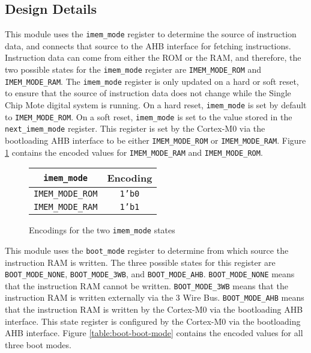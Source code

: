 \subsection{Design Details}
This module uses the \texttt{imem\_mode} register to determine the source of instruction data, and connects that source to the AHB interface for fetching instructions. Instruction data can come from either the ROM or the RAM, and therefore, the two possible states for the \texttt{imem\_mode} register are \texttt{IMEM\_MODE\_ROM} and \texttt{IMEM\_MODE\_RAM}. The \texttt{imem\_mode} register is only updated on a hard or soft reset, to ensure that the source of instruction data does not change while the Single Chip Mote digital system is running. On a hard reset, \texttt{imem\_mode} is set by default to \texttt{IMEM\_MODE\_ROM}. On a soft reset, \texttt{imem\_mode} is set to the value stored in the \texttt{next\_imem\_mode} register. This register is set by the Cortex-M0 via the bootloading AHB interface to be either \texttt{IMEM\_MODE\_ROM} or \texttt{IMEM\_MODE\_RAM}. Figure \ref{table:boot-imem-mode} contains the encoded values for \texttt{IMEM\_MODE\_RAM} and \texttt{IMEM\_MODE\_ROM}.

\begin{figure}
	\centering
	\begin{tabular}{|c|c|}
		\hline
		\texttt{imem\_mode} & Encoding \\
		\hline
		\texttt{IMEM\_MODE\_ROM} & \texttt{1'b0} \\
		\texttt{IMEM\_MODE\_RAM} & \texttt{1'b1} \\
		\hline
	\end{tabular}
	\caption{Encodings for the two \texttt{imem\_mode} states}
	\label{table:boot-imem-mode}
\end{figure}


This module uses the \texttt{boot\_mode} register to determine from which source the instruction RAM is written. The three possible states for this register are \texttt{BOOT\_MODE\-\_NONE}, \texttt{BOOT\_MODE\_3WB}, and \texttt{BOOT\_MODE\_AHB}. \texttt{BOOT\_MODE\_NONE} means that the instruction RAM cannot be written. \texttt{BOOT\_MODE\_3WB} means that the instruction RAM is written externally via the 3 Wire Bus. \texttt{BOOT\_MODE\_AHB} means that the instruction RAM is written by the Cortex-M0 via the bootloading AHB interface. This state register is configured by the Cortex-M0 via the bootloading AHB interface. Figure \ref{table:boot-boot-mode} contains the encoded values for all three boot modes.

